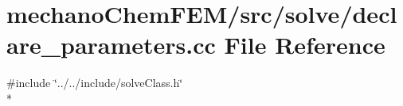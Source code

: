 \section{mechano\-Chem\-F\-E\-M/src/solve/declare\-\_\-parameters.cc File Reference}
\label{solve_2declare__parameters_8cc}
{\ttfamily \#include \char`\"{}../../include/solve\-Class.\-h\char`\"{}}\\*
